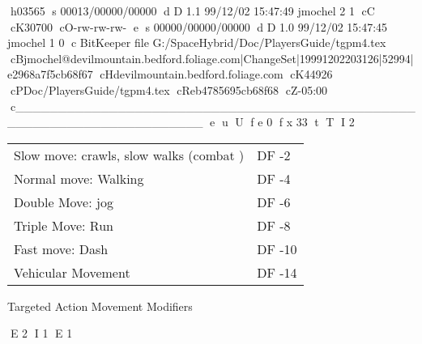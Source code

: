 h03565
s 00013/00000/00000
d D 1.1 99/12/02 15:47:49 jmochel 2 1
cC
cK30700
cO-rw-rw-rw-
e
s 00000/00000/00000
d D 1.0 99/12/02 15:47:45 jmochel 1 0
c BitKeeper file G:/SpaceHybrid/Doc/PlayersGuide/tgpm4.tex
cBjmochel@devilmountain.bedford.foliage.com|ChangeSet|19991202203126|52994|e2968a7f5cb68f67
cHdevilmountain.bedford.foliage.com
cK44926
cPDoc/PlayersGuide/tgpm4.tex
cReb4785695cb68f68
cZ-05:00
c______________________________________________________________________
e
u
U
f e 0
f x 33
t
T
I 2
\begin{SHTable}
	\begin{tabular}{ll}
	Slow move: crawls, slow walks (combat )   & DF -2 \\
	Normal move: Walking					   & DF -4 \\
	Double Move: jog						   & DF -6 \\
	Triple Move: Run						   & DF -8 \\
	Fast move: Dash						   & DF -10\\
	Vehicular Movement						   & DF -14 \\ 
	\end{tabular}
    \caption{Targeted Action Movement Modifiers}
\end{SHTable}
E 2
I 1
E 1
